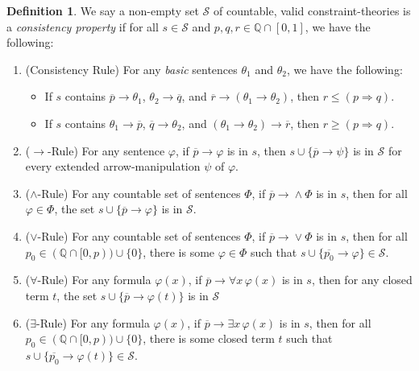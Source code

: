 \documentclass{amsart}
\theoremstyle{definition}
\newtheorem{definition}[theorem]{Definition}
\numberwithin{equation}{theorem}
\renewcommand{\phi}{\varphi}
\newcommand{\Q}{\mathbb{Q}}
\newcommand{\unvee}{{\vee}}
\newcommand{\unwedge}{{\wedge}}
\newcommand{\rat}[1]{{\overline{#1}}}
\newcommand{\narrow}[1]{\xrightarrow{#1}}
\renewcommand{\to}{\narrow{}}
\begin{document}
\begin{definition}\label{def:cp}
	\newcommand\litem[1]{\item{(#1)}}
	We say a non-empty set $\mathscr{S}$ of countable, valid constraint-theories is a \emph{consistency property} if for all $s\in \mathscr{S}$ and $p,q,r\in\Q\cap[0,1]$, we have the following:
  \begin{enumerate}[label=(CP\arabic*)]
  \litem{Consistency Rule}\label{itm:cp-rule-consistency}
    For any \emph{basic} sentences $\theta_1$ and $\theta_2$, we have the following:
    \begin{itemize}
    \item If $s$ contains $\rat p\to\theta_1$, $\theta_2\to\rat q$, and $\rat r\to(\theta_1\to\theta_2)$, then $r\leq(p\Rightarrow q)$.
    \item If $s$ contains $\theta_1\to\rat p$, $\rat q\to\theta_2$, and $(\theta_1\to\theta_2)\to\rat r$, then $r\geq(p\Rightarrow q)$.
    \end{itemize}
  \litem{$\to$-Rule}\label{itm:cp-rule-pushdown}
    For any sentence $\phi$, if $\rat p\to\phi$ is in $s$, then $s\cup\{\rat p\to\psi\}$ is in $\mathscr{S}$ for every extended arrow-manipulation $\psi$ of $\phi$.
  \litem{$\wedge$-Rule}\label{itm:cp-rule-wedge}
    For any countable set of sentences $\Phi$, if $\rat p\to\unwedge\Phi$ is in $s$, then for all $\phi\in\Phi$, the set $s\cup\{\rat p\to\phi\}$ is in $\mathscr{S}$.
	\litem{$\vee$-Rule}\label{itm:cp-rule-vee}
		For any countable set of sentences $\Phi$, if $\rat p\to\unvee\Phi$ is in $s$, then for all $p_0\in(\Q\cap[0,p))\cup\{0\}$, there is some $\phi\in\Phi$ such that $s\cup\{\rat{p_0}\to\phi\}\in \mathscr{S}$.
	\litem{$\forall$-Rule}\label{itm:cp-rule-forall}
	  For any formula $\phi(x)$, if $\rat{p}\to\forall x\,\phi(x)$ is in $s$, then for any closed term $t$, the set $s\cup\{\rat p\to\phi(t)\}$ is in $\mathscr{S}$
	\litem{$\exists$-Rule}\label{itm:cp-rule-exists}
	  For any formula $\phi(x)$, if $\rat p\to\exists x\,\phi(x)$ is in $s$, then for all $p_0\in(\Q\cap[0,p))\cup\{0\}$, there is some closed term $t$ such that $s\cup\{\rat{p_0}\to\phi(t)\}\in \mathscr{S}$.

\end{enumerate}
\end{definition}
\end{document}
